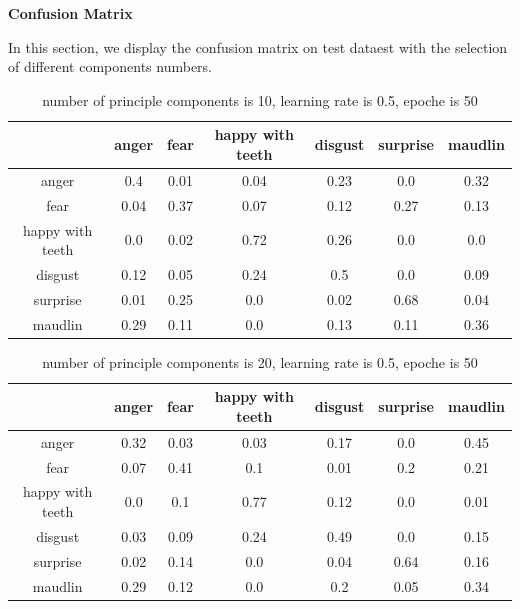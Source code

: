 \documentclass{article} %
\begin{document}
\newpage
\textbf{Confusion Matrix}

In this section, we display the confusion matrix on test dataest with the selection of different components numbers.

\begin{table}[htb]
    \caption{number of principle components is 10, learning rate is 0.5, epoche is 50}
    \begin{center}
    \begin{tabular}{|c|c|c|c|c|c|c|}
     \hline
     & anger & fear & happy with teeth & disgust & surprise & maudlin \\
     \hline
     anger & 0.4 & 0.01 & 0.04 & 0.23 & 0.0 & 0.32\\
     \hline
     fear & 0.04 & 0.37 & 0.07 & 0.12 & 0.27 & 0.13\\
     \hline
     happy with teeth & 0.0 & 0.02 & 0.72 & 0.26 & 0.0 & 0.0\\
     \hline
     disgust & 0.12 & 0.05 & 0.24 & 0.5 & 0.0 & 0.09\\
     \hline
     surprise & 0.01 & 0.25 & 0.0 & 0.02 & 0.68 & 0.04\\
     \hline
     maudlin & 0.29 & 0.11 & 0.0 & 0.13 & 0.11 & 0.36\\
    \hline
    \end{tabular}
    \end{center}
\end{table}

\begin{table}[htb]
    \caption{number of principle components is 20, learning rate is 0.5, epoche is 50}
    \begin{center}
    \begin{tabular}{|c|c|c|c|c|c|c|}
    \hline
    & anger & fear & happy with teeth & disgust & surprise & maudlin \\
    \hline
    anger & 0.32 & 0.03 & 0.03 & 0.17 & 0.0 & 0.45\\
    \hline
    fear & 0.07 & 0.41 & 0.1 & 0.01 & 0.2 & 0.21\\
    \hline
    happy with teeth & 0.0 & 0.1 & 0.77 & 0.12 & 0.0 & 0.01\\
    \hline
    disgust & 0.03 & 0.09 & 0.24 & 0.49 & 0.0 & 0.15\\
    \hline
    surprise & 0.02 & 0.14 & 0.0 & 0.04 & 0.64 & 0.16\\
    \hline
    maudlin & 0.29 & 0.12 & 0.0 & 0.2 & 0.05 & 0.34\\
    \hline
    \end{tabular}
    \end{center}
\end{table}
\end{document}
